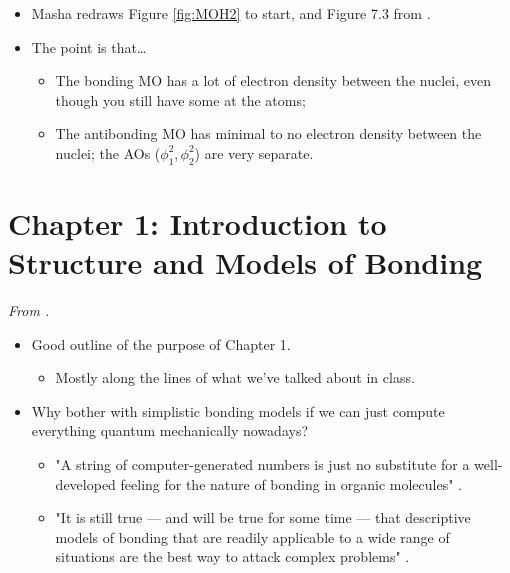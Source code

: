 \documentclass[../notes.tex]{subfiles}
\begin{document}
\begin{itemize}
    \begin{itemize}
        \item Masha redraws Figure \ref{fig:MOH2} to start, and Figure 7.3 from \textcite{bib:CHEM26100Notes}.
        \item The point is that\dots
        \begin{itemize}
            \item The bonding MO has a lot of electron density between the nuclei, even though you still have some at the atoms;
            \item The antibonding MO has minimal to no electron density between the nuclei; the AOs ($\phi_1^2,\phi_2^2$) are very separate.
        \end{itemize}
    \end{itemize}
\end{itemize}



\section{Chapter 1: Introduction to Structure and Models of Bonding}
\emph{From \textcite{bib:Anslyn}.}
\begin{itemize}
    \item {}Good outline of the purpose of Chapter 1.
    \begin{itemize}
        \item Mostly along the lines of what we've talked about in class.
    \end{itemize}
    \item Why bother with simplistic bonding models if we can just compute everything quantum mechanically nowadays?
    \begin{itemize}
        \item "A string of computer-generated numbers is just no substitute for a well-developed feeling for the nature of bonding in organic molecules" \parencite[3]{bib:Anslyn}.
        \item "It is still true --- and will be true for some time --- that descriptive models of bonding that are readily applicable to a wide range of situations are the best way to attack complex problems" \parencite[4]{bib:Anslyn}.
    \end{itemize}
\end{itemize}
\end{document}
